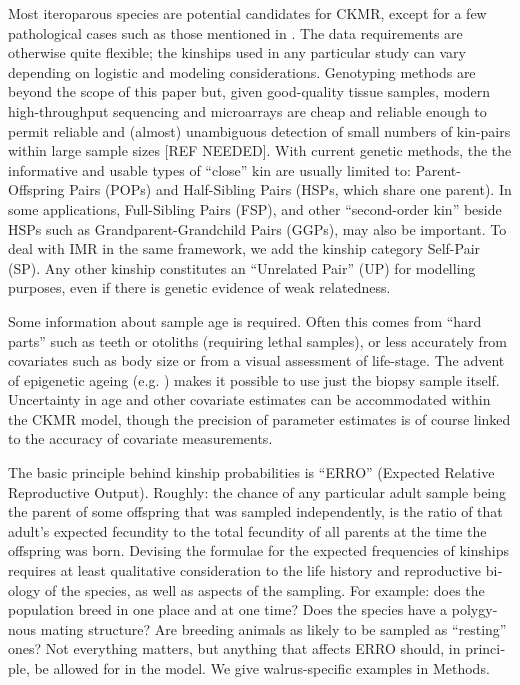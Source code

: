 Most iteroparous species are potential candidates for CKMR, except
for a few pathological cases such as those mentioned in \citet{bravington_close-kin_2016}.
The data requirements are otherwise quite flexible; the kinships used
in any particular study can vary depending on logistic and modeling
considerations. Genotyping methods are beyond the scope of this paper
but, given good-quality tissue samples, modern high-throughput sequencing
and microarrays are cheap and reliable enough to permit reliable and
(almost) unambiguous detection of small numbers of kin-pairs within
large sample sizes {[}REF NEEDED{]}. With current genetic methods,
the the informative and usable types of ``close'' kin are usually
limited to: Parent-Offspring Pairs (POPs) and Half-Sibling Pairs (HSPs,
which share one parent). In some applications, Full-Sibling Pairs
(FSP), and other ``second-order kin'' beside HSPs such as Grandparent-Grandchild
Pairs (GGPs), may also be important. To deal with IMR in the same
framework, we add the kinship category Self-Pair (SP). Any other kinship
constitutes an ``Unrelated Pair'' (UP) for modelling purposes, even
if there is genetic evidence of weak relatedness.

Some information about sample age is required. Often this comes from
``hard parts'' such as teeth or otoliths (requiring lethal samples),
or less accurately from covariates such as body size or from a visual
assessment of life-stage. The advent of epigenetic ageing (e.g. \citealp{Weber2024DNAgeray,Robeck2023DNAgepinni,Peters2023DNAgebotdol})
makes it possible to use just the biopsy sample itself. Uncertainty
in age and other covariate estimates can be accommodated within the
CKMR model, though the precision of parameter estimates is of course
linked to the accuracy of covariate measurements.

%
The basic principle behind kinship probabilities is ``ERRO'' (Expected
Relative Reproductive Output). Roughly: the chance of any particular
adult sample being the parent of some offspring that was sampled independently,
is the ratio of that adult's expected fecundity to the total fecundity
of all parents at the time the offspring was born. \foreignlanguage{american}{Devising
the formulae for the expected frequencies of kinships requires at
least qualitative consideration to the life history and reproductive
biology of the species, as well as aspects of the sampling. For example:
does the population breed in one place and at one time? Does the species
have a polygynous mating structure? Are breeding animals as likely
to be sampled as ``resting'' ones? Not everything matters, but anything
that affects ERRO should, in principle, be allowed for in the model.
We give walrus-specific examples in Methods.}
%

